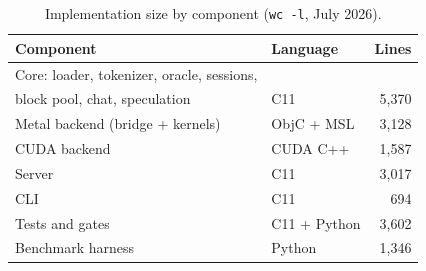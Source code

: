 \documentclass[sigconf,nonacm,screen]{acmart}
\newcommand{\code}[1]{\texttt{\small #1}}
\begin{document}
\begin{table}[t]\centering\small
\caption{Implementation size by component (\code{wc -l}, July 2026).}
\label{tab:loc}
\begin{tabular}{@{}llr@{}}
\toprule
Component & Language & Lines \\
\midrule
Core: loader, tokenizer, oracle, sessions, & & \\
\quad block pool, chat, speculation & C11 & 5{,}370 \\ %
Metal backend (bridge + kernels) & ObjC + MSL & 3{,}128 \\ %
CUDA backend & CUDA C++ & 1{,}587 \\ %
Server & C11 & 3{,}017 \\ %
CLI & C11 & 694 \\ %
Tests and gates & C11 + Python & 3{,}602 \\ %
Benchmark harness & Python & 1{,}346 \\ %
\bottomrule
\end{tabular}
\end{table}
\end{document}
